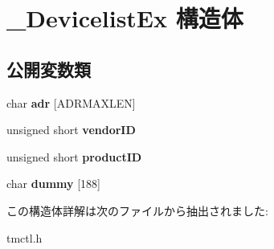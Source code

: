 \hypertarget{struct___devicelist_ex}{}\section{\+\_\+\+Devicelist\+Ex 構造体}
\label{struct___devicelist_ex}
\subsection*{公開変数類}
\begin{DoxyCompactItemize}
\item 
\mbox{\label{struct___devicelist_ex_a55f7e0697a1e58d416aa850c6ea0d714}} 
char {\bfseries adr} \mbox{[}A\+D\+R\+M\+A\+X\+L\+EN\mbox{]}
\item 
\mbox{\label{struct___devicelist_ex_a317a5a5f731db982846589f5ad4f7a03}} 
unsigned short {\bfseries vendor\+ID}
\item 
\mbox{\label{struct___devicelist_ex_a38a0533aaba6b8dc583d90363f351481}} 
unsigned short {\bfseries product\+ID}
\item 
\mbox{\label{struct___devicelist_ex_a0105c187ba3ff2943e32c9f040d7d6fc}} 
char {\bfseries dummy} \mbox{[}188\mbox{]}
\end{DoxyCompactItemize}


この構造体詳解は次のファイルから抽出されました\+:\begin{DoxyCompactItemize}
\item 
tmctl.\+h\end{DoxyCompactItemize}
